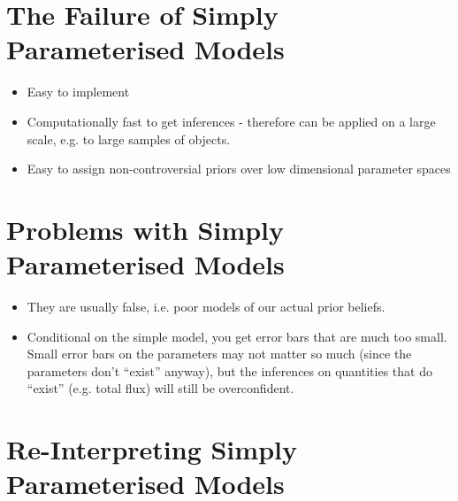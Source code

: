 \documentclass[letterpaper, 11pt]{article}
\begin{document}
\section{The Failure of Simply Parameterised Models}
\begin{itemize}
\item Easy to implement \\
\item Computationally fast to get inferences - therefore can be applied on a large scale, e.g. to large samples of objects. \\
\item Easy to assign non-controversial priors over low dimensional parameter spaces \\
\end{itemize}

\section{Problems with Simply Parameterised Models}
\begin{itemize}
\item They are usually false, i.e. poor models of our actual prior beliefs. \\
\item Conditional on the simple model, you get error bars that are much too small. Small error bars on the parameters may not matter so much (since the parameters don't ``exist'' anyway), but the inferences on quantities that do ``exist'' (e.g. total flux) will still be overconfident. \\
\end{itemize}

\section{Re-Interpreting Simply Parameterised Models}
\end{document}

